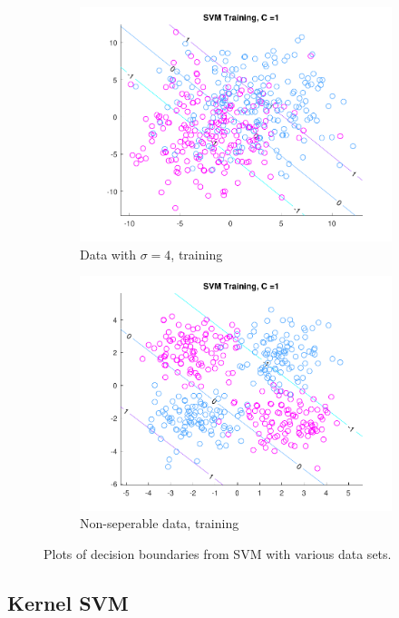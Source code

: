 \begin{figure}[h!]
\begin{subfigure}[b]{0.22\textwidth}
	\includegraphics[scale=0.4]{figures/hw2_2_stdev4_a_1.pdf}
	\caption{Data with $\sigma = 4$, training}\label{fig:svm_data_stdev4a}
    \end{subfigure}  
    \begin{subfigure}[b]{0.22\textwidth}
	\includegraphics[scale=0.4]{figures/hw2_2_nonsep_a_1.pdf}
	\caption{Non-seperable data, training}\label{fig:svm_data_nonsep_a}
    \end{subfigure}  
    \caption{Plots of decision boundaries from SVM with various data sets.}  \label{fig:LR_plots}  
\end{figure}

\subsection{Kernel SVM}

